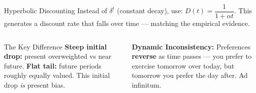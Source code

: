 \documentclass[aspectratio=169]{beamer}
\begin{document}
\begin{frame}{Hyperbolic Discounting}
Instead of $\delta^t$ (constant decay), use: $D(t) = \dfrac{1}{1 + \alpha t}$. This generates a \alert{discount rate that falls over time} --- matching the empirical evidence.
\begin{columns}
\begin{alertblock}{The Key Difference}
\textbf{Steep initial drop:} present overweighted vs near future. \textbf{Flat tail:} future periods roughly equally valued. This initial drop \textit{is} present bias.
\end{alertblock}
\textcolor{beteal}{\textbf{Dynamic Inconsistency:}} Preferences \textbf{reverse} as time passes --- you prefer to exercise tomorrow over today, but tomorrow you prefer the day after. Ad infinitum.
\end{columns}
\end{frame}
\end{document}
